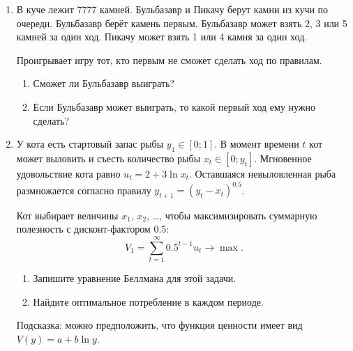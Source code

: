 \documentclass[12pt]{article}
\begin{document}
\begin{enumerate}
    \item 
        В куче лежит 7777 камней.
        Бульбазавр и Пикачу берут камни из кучи по очереди.
        Бульбазавр берёт камень первым.
        Бульбазавр может взять 2, 3 или 5 камней за один ход.
        Пикачу может взять 1 или 4 камня за один ход.
        
        Проигрывает игру тот, кто первым не сможет сделать ход по правилам.
        \begin{enumerate}
         \item Сможет ли Бульбазавр выиграть?
         \item Если Бульбазавр может выиграть, то какой первый ход ему нужно сделать?
        \end{enumerate}
    \item У кота есть стартовый запас рыбы $y_1 \in [0;1]$.
    В момент времени $t$ кот может выловить и съесть количество рыбы $x_t \in [0; y_t]$.
    Мгновенное удовольствие кота равно $u_t = 2 + 3\ln x_t$.
    Оставшаяся невыловленная рыба размножается согласно правилу $y_{t+1} = (y_t - x_t)^{0.5}$.

    Кот выбирает величины $x_1$, $x_2$, \ldots, чтобы максимизировать 
    суммарную полезность с дисконт-фактором $0.5$:
    \[
     V_1 = \sum_{t=1}^{\infty} 0.5^{t-1} u_t \to \max.
    \]

    \begin{enumerate}
        \item Запишите уравнение Беллмана для этой задачи. 
        \item Найдите оптимальное потребление в каждом периоде. 
    \end{enumerate}
    
 
 
    Подсказка: можно предположить, что функция ценности имеет вид $V(y) = a + b \ln y$.


\end{enumerate}


\newpage
\end{document}
